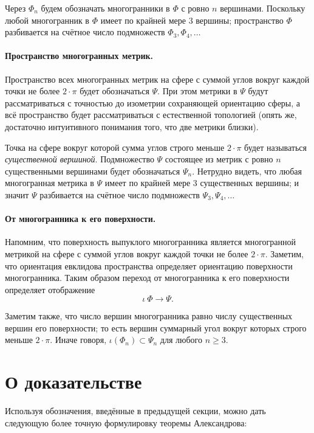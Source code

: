 \documentclass[oneside,a4paper]{article}
\begin{document}
Через $\Phi_n$ будем обозначать многогранники в $\Phi$ с ровно $n$ вершинами.
Поскольку любой многогранник в $\Phi$ имеет по крайней мере 3 вершины;
пространство $\Phi$ разбивается на счётное число подмножеств $\Phi_3,\Phi_4,\dots$

\paragraph{Пространство многогранных метрик.}
Пространство всех многогранных метрик на сфере с суммой углов вокруг каждой точки не более $2\cdot\pi$ будет обозначаться $\Psi$.
При этом метрики в $\Psi$ будут рассматриваться с точностью до изометрии сохраняющей ориентацию сферы, а всё пространство будет рассматриваться с естественной топологией (опять же, достаточно интуитивного понимания того, что две метрики близки).

Точка на сфере вокруг которой сумма углов строго меньше $2\cdot\pi$ будет называться \emph{существенной вершиной}.
Подмножество $\Psi$ состоящее из метрик с ровно $n$ существенными вершинами будет обозначаться $\Psi_n$.
Нетрудно видеть, что любая многогранная метрика в $\Psi$ имеет по крайней мере 3 существенных вершины;
и значит $\Psi$ разбивается на счётное число подмножеств $\Psi_3,\Psi_4,\dots$

\paragraph{От многогранника к его поверхности.}
Напомним, что поверхность выпуклого многогранника является многогранной метрикой на сфере с суммой углов вокруг каждой точки не более $2\cdot\pi$.
Заметим, что ориентация евклидова пространства определяет ориентацию поверхности многогранника.
Таким образом переход от многогранника к его поверхности определяет отображение 
\[\iota\:\Phi\to \Psi.\]

Заметим также, что число вершин многогранника равно числу существенных вершин его поверхности;
то есть вершин суммарный угол вокруг которых строго меньше $2\cdot\pi$.
Иначе говоря, $\iota(\Phi_n)\subset \Psi_n$ для любого $n\ge 3$.

\section{О доказательстве}

Используя обозначения, введённые в предыдущей секции, можно дать следующую более точную формулировку теоремы Александрова:
\end{document}
